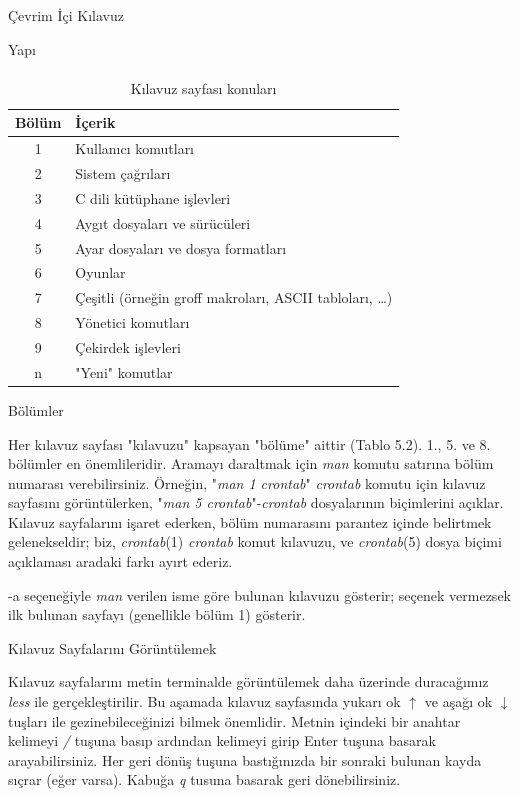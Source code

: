\begin{section}{Çevrim İçi Kılavuz}
\begin{subsection}{Yapı}
\paragraph{}{
\begin {table}[H]
\caption {Kılavuz sayfası konuları} \label{tab:title} 
\begin{tabular}{c l}
\hline
Bölüm & {İçerik}\\
\hline
1 	&	Kullanıcı komutları \\
2 &	Sistem çağrıları \\
3 &	C dili kütüphane işlevleri \\
4 &	Aygıt dosyaları ve sürücüleri \\
5 &	Ayar dosyaları ve dosya formatları \\
6 & Oyunlar \\
7 &	Çeşitli (örneğin groff makroları, ASCII tabloları, …) \\
8 &	Yönetici komutları \\
9 &	Çekirdek işlevleri \\
n & "Yeni" komutlar \\
\hline
\end{tabular}
\end {table}
}
\end{subsection}
\begin{subsection}{Bölümler}

Her kılavuz sayfası "kılavuzu" kapsayan "bölüme" aittir (Tablo 5.2). 1., 5. ve 8. bölümler en önemlileridir. Aramayı daraltmak için \emph{man} komutu satırına bölüm numarası verebilirsiniz. Örneğin, "\emph{man 1 crontab}" \emph{crontab} komutu için kılavuz sayfasını görüntülerken, "\emph{man 5 crontab}"-\emph{crontab} dosyalarının biçimlerini açıklar. Kılavuz sayfalarını işaret ederken, bölüm numarasını parantez içinde belirtmek gelenekseldir; biz, \emph{crontab}(1) \emph{crontab} komut kılavuzu, ve \emph{crontab}(5) dosya biçimi açıklaması aradaki farkı ayırt ederiz.

-a seçeneğiyle \emph{man} verilen isme göre bulunan kılavuzu gösterir; seçenek vermezsek ilk bulunan sayfayı (genellikle bölüm 1) gösterir.
\end{subsection}
\begin{subsection}{Kılavuz Sayfalarını Görüntülemek}

Kılavuz sayfalarını metin terminalde görüntülemek daha üzerinde duracağımız \emph{less} ile gerçekleştirilir. Bu aşamada kılavuz sayfasında yukarı ok \begin{math}\uparrow\end{math} ve aşağı ok \begin{math}\downarrow\end{math} tuşları ile gezinebileceğinizi bilmek önemlidir. Metnin içindeki bir anahtar kelimeyi \emph{/} tuşuna basıp ardından kelimeyi girip Enter tuşuna basarak arayabilirsiniz. Her geri dönüş tuşuna bastığınızda bir sonraki bulunan kayda sıçrar (eğer varsa). Kabuğa \emph{q} tusuna basarak geri dönebilirsiniz.


\end{subsection}
\end{section}
